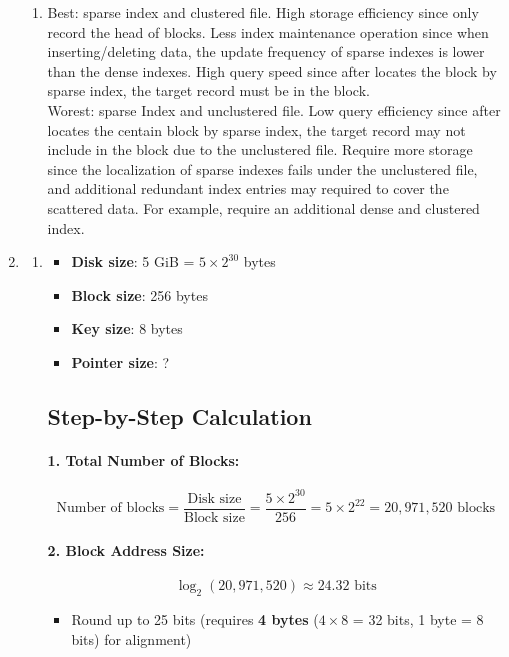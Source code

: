 \documentclass[12pt]{extarticle}
\begin{document}
\begin{flushleft}
\begin{enumerate}
\begin{enumerate}
\item Best: sparse index and clustered file. High storage efficiency since only record the head of blocks. Less index maintenance operation since when inserting/deleting data, the update frequency of sparse indexes is lower than the dense indexes. High query speed since after locates the block by sparse index, the target record must be in the block.\\
Worest: sparse Index and unclustered file. Low query efficiency since after locates the centain block by sparse index, the target record may not include in the block due to the unclustered file. Require more storage since the localization of sparse indexes fails under the unclustered file, and additional redundant index entries may required to cover the scattered data. For example, require an additional dense and clustered index.

\end{enumerate}

\item

\begin{enumerate}
\item
\begin{itemize}
    \item \textbf{Disk size}: 5 GiB = \(5 \times 2^{30}\) bytes
    \item \textbf{Block size}: 256 bytes
    \item \textbf{Key size}: 8 bytes
    \item \textbf{Pointer size}: ?
\end{itemize}

\subsection*{Step-by-Step Calculation}

\paragraph{1. Total Number of Blocks:}
\[
\text{Number of blocks} = \frac{\text{Disk size}}{\text{Block size}} = \frac{5 \times 2^{30}}{256} = 5 \times 2^{22} = 20,\!971,\!520 \text{ blocks}
\]

\paragraph{2. Block Address Size:}
\[
\log_2(20,\!971,\!520) \approx 24.32 \text{ bits}
\]
\begin{itemize}
    \item Round up to 25 bits (requires \textbf{4 bytes} (\(4 \times 8\) = 32 bits, 1 byte = 8 bits) for alignment)
\end{itemize}


\end{enumerate}
\end{enumerate}
\end{flushleft}
\end{document}
